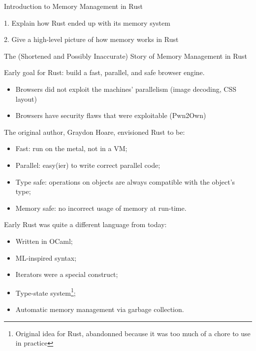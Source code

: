 \documentclass[9pt]{beamer}
\renewcommand\big[1]{
  \begin{center}
    \Large{#1}
  \end{center}
}
\begin{document}
\begin{frame}[plain]
  \centering\Huge{Introduction to Memory Management in Rust}
\end{frame}

\begin{frame}
  \big{1. Explain how Rust ended up with its memory system}

  \big{2. Give a high-level picture of how memory works in Rust}
\end{frame}

\begin{frame}
  \centering\Huge{The (Shortened and Possibly Inaccurate) Story of Memory Management in Rust}
\end{frame}

\begin{frame}
  \big{Early goal for Rust: build a fast, parallel, and safe browser engine.}

  \begin{itemize}
    \item Browsers did not exploit the machines' parallelism (image decoding, CSS layout)
    \item Browsers have security flaws that were exploitable (Pwn2Own)
  \end{itemize}
\end{frame}

\begin{frame}
  \big{The original author, Graydon Hoare, envisioned Rust to be:}

  \begin{itemize}
    \item Fast: run on the metal, not in a VM;
    \item Parallel: easy(ier) to write correct parallel code;
    \item Type safe: operations on objects are always compatible with the object's type;
    \item Memory safe: no incorrect usage of memory at run-time.
  \end{itemize}
\end{frame}

\begin{frame}
  \big{Early Rust was quite a different language from today:}

  \begin{itemize}
    \item Written in OCaml;
    \item ML-inspired syntax;
    \item Iterators were a special construct;
    \item Type-state system\footnote{Original idea for Rust, abandonned because it was too much of a chore to use in practice};
    \item Automatic memory management via garbage collection.
  \end{itemize}
\end{frame}
\end{document}
